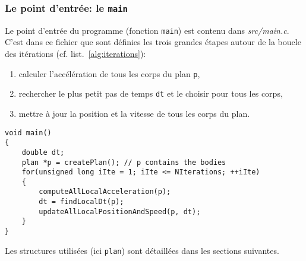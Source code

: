 \subsubsection{Le point d'entrée: le \texttt{main}}
Le point d'entrée du programme (fonction \texttt{main}) est contenu dans \textit{src/main.c}.
C'est dans ce fichier que sont définies les trois grandes étapes autour de la boucle des itérations (cf. list.~\ref{alg:iterations}):
\begin{enumerate}
	\item calculer l'accélération de tous les corps du plan \texttt{p},
	\item rechercher le plus petit pas de temps \texttt{dt} et le choisir pour tous les corps,
	\item mettre à jour la position et la vitesse de tous les corps du plan.
\end{enumerate}
\begin{lstlisting}[caption={Code simplifié du calcul par itération},label={alg:iterations}]
void main()
{
	double dt;
	plan *p = createPlan(); // p contains the bodies
	for(unsigned long iIte = 1; iIte <= NIterations; ++iIte) 
	{
		computeAllLocalAcceleration(p);
		dt = findLocalDt(p);
		updateAllLocalPositionAndSpeed(p, dt);
	}
}
\end{lstlisting}
Les structures utilisées (ici \texttt{plan}) sont détaillées dans les sections suivantes.

